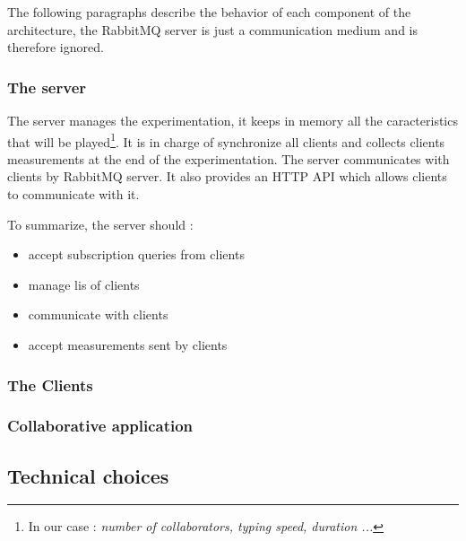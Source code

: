 \documentclass[twoside,twocolumn]{article}
\begin{document}
\noindent The following paragraphs describe the behavior of each component of the architecture, the RabbitMQ server is just a communication medium and is therefore ignored.

\subsubsection{The server}

The server manages the experimentation, it keeps in memory all the caracteristics that will be played\footnote{In our case : \it{number of collaborators, typing speed, duration ...}}. It is in charge of synchronize all clients and collects clients
measurements at the end of the experimentation. The server communicates with clients by RabbitMQ server. It also provides an HTTP API which allows clients to communicate with it.

\noindent To summarize, the server should :
\begin{itemize}
  \item accept subscription queries from clients
  \item manage lis of clients
  \item communicate with clients
  \item accept measurements sent by clients
\end{itemize}


\subsubsection{The Clients}

\subsubsection{Collaborative application}


\subsection{Technical choices}


\end{document}
